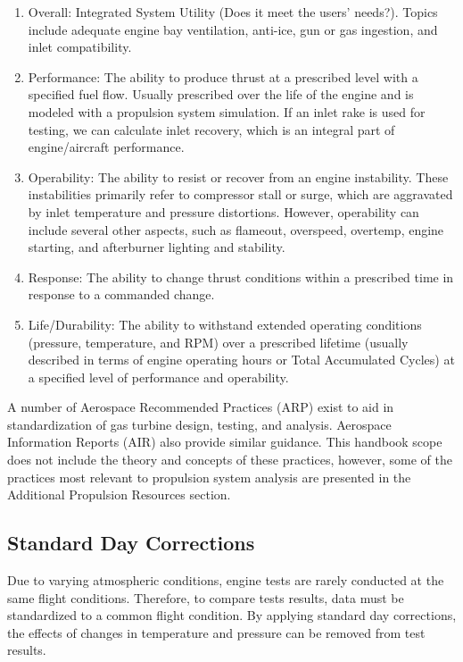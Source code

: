 \documentclass[
]{book}
\providecommand{\tightlist}{%
  \setlength{\itemsep}{0pt}\setlength{\parskip}{0pt}}
\begin{document}
\begin{enumerate}
\def\labelenumi{\arabic{enumi}.}
\tightlist
\item
  Overall: Integrated System Utility (Does it meet the users' needs?).
  Topics include adequate engine bay ventilation, anti-ice, gun or gas ingestion,
  and inlet compatibility.
\item
  Performance: The ability to produce thrust at a prescribed level with a
  specified fuel flow. Usually prescribed over the life of the engine and is
  modeled with a propulsion system simulation. If an inlet rake is used for
  testing, we can calculate inlet recovery, which is an integral part of
  engine/aircraft performance.
\item
  Operability: The ability to resist or recover from an engine instability.
  These instabilities primarily refer to compressor stall or surge, which are
  aggravated by inlet temperature and pressure distortions. However, operability
  can include several other aspects, such as flameout, overspeed, overtemp, engine
  starting, and afterburner lighting and stability.
\item
  Response: The ability to change thrust conditions within a prescribed time in
  response to a commanded change.
\item
  Life/Durability: The ability to withstand extended operating conditions
  (pressure, temperature, and RPM) over a prescribed lifetime (usually described
  in terms of engine operating hours or Total Accumulated Cycles) at a specified
  level of performance and operability.
\end{enumerate}

A number of Aerospace Recommended Practices (ARP) exist to aid in
standardization of gas turbine design, testing, and analysis. Aerospace
Information Reports (AIR) also provide similar guidance. This handbook scope
does not include the theory and concepts of these practices, however, some of
the practices most relevant to propulsion system analysis are presented in the
Additional Propulsion Resources section.

\hypertarget{standard-day-corrections}{%
\subsection{Standard Day Corrections}\label{standard-day-corrections}}

Due to varying atmospheric conditions, engine tests are rarely conducted at the
same flight conditions. Therefore, to compare tests results, data must be
standardized to a common flight condition. By applying standard day corrections,
the effects of changes in temperature and pressure can be removed from test
results.
\end{document}
